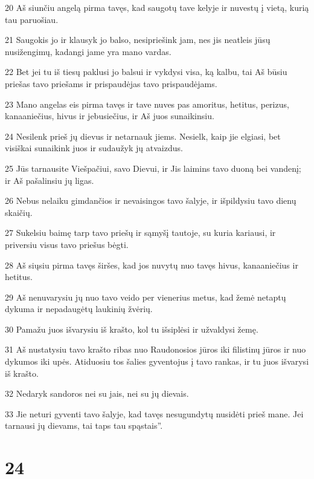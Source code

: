 \par 20 Aš siunčiu angelą pirma tavęs, kad saugotų tave kelyje ir nuvestų į vietą, kurią tau paruošiau. 
\par 21 Saugokis jo ir klausyk jo balso, nesipriešink jam, nes jis neatleis jūsų nusižengimų, kadangi jame yra mano vardas. 
\par 22 Bet jei tu iš tiesų paklusi jo balsui ir vykdysi visa, ką kalbu, tai Aš būsiu priešas tavo priešams ir prispaudėjas tavo prispaudėjams. 
\par 23 Mano angelas eis pirma tavęs ir tave nuves pas amoritus, hetitus, perizus, kanaaniečius, hivus ir jebusiečius, ir Aš juos sunaikinsiu. 
\par 24 Nesilenk prieš jų dievus ir netarnauk jiems. Nesielk, kaip jie elgiasi, bet visiškai sunaikink juos ir sudaužyk jų atvaizdus. 
\par 25 Jūs tarnausite Viešpačiui, savo Dievui, ir Jis laimins tavo duoną bei vandenį; ir Aš pašalinsiu jų ligas. 
\par 26 Nebus nelaiku gimdančios ir nevaisingos tavo šalyje, ir išpildysiu tavo dienų skaičių. 
\par 27 Sukelsiu baimę tarp tavo priešų ir sąmyšį tautoje, su kuria kariausi, ir priversiu visus tavo priešus bėgti. 
\par 28 Aš siųsiu pirma tavęs širšes, kad jos nuvytų nuo tavęs hivus, kanaaniečius ir hetitus. 
\par 29 Aš nenuvarysiu jų nuo tavo veido per vienerius metus, kad žemė netaptų dykuma ir nepadaugėtų laukinių žvėrių. 
\par 30 Pamažu juos išvarysiu iš krašto, kol tu išsiplėsi ir užvaldysi žemę. 
\par 31 Aš nustatysiu tavo krašto ribas nuo Raudonosios jūros iki filistinų jūros ir nuo dykumos iki upės. Atiduosiu tos šalies gyventojus į tavo rankas, ir tu juos išvarysi iš krašto. 
\par 32 Nedaryk sandoros nei su jais, nei su jų dievais. 
\par 33 Jie neturi gyventi tavo šalyje, kad tavęs nesugundytų nusidėti prieš mane. Jei tarnausi jų dievams, tai taps tau spąstais”.



\chapter{24}


